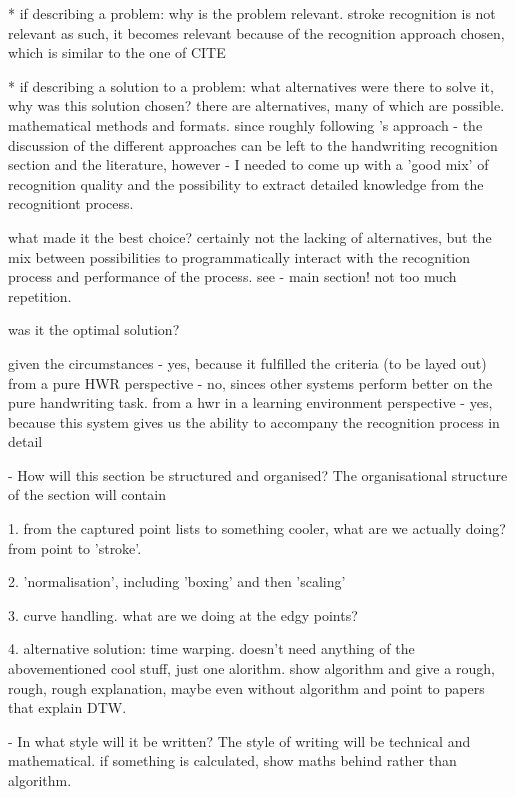   * if describing a problem: why is the problem relevant.
    stroke recognition is not relevant as such, it becomes relevant because
    of the recognition approach chosen, which is similar to the one of CITE

  * if describing a solution to a problem: what alternatives were
    there to solve it, why was this solution chosen? 
    there are alternatives, many of which are possible. mathematical methods 
    and formats. since roughly following 's
    \citeyear{Nakagawa2008} approach - the discussion of the different 
    approaches can be left to the handwriting recognition section and the 
    literature, however - I needed to come up with a 'good mix' of 
    recognition quality and the possibility to extract detailed knowledge 
    from the recognitiont process.
     
    what made it the best choice? 
    certainly not the lacking of alternatives, but the mix between 
    possibilities to programmatically interact with the recognition process
    and performance of the process.
    see - main section! not too much repetition.

    was it the optimal solution?

    given the circumstances - yes, because it fulfilled the criteria 
    (to be layed out)
    from a pure HWR perspective - no, sinces other systems perform better on the
    pure handwriting task.
    from a hwr in a learning environment perspective - yes, because this
    system gives us the ability to accompany the recognition process in detail
    

- How will this section be structured and organised?
  The organisational structure of the section will contain

  1. from the captured point lists to something cooler, what are we actually
     doing? from point to 'stroke'.

  2. 'normalisation', including 'boxing' and then 'scaling'

  3. curve handling. what are we doing at the edgy points?

  4. alternative solution: time warping. doesn't need anything of the
     abovementioned cool stuff, just one alorithm.
     show algorithm and give a rough, rough, rough explanation,
     maybe even without algorithm and point to papers that explain DTW.

- In what style will it be written?
  The style of writing will be technical and mathematical.
  if something is calculated, show maths behind rather than algorithm.

